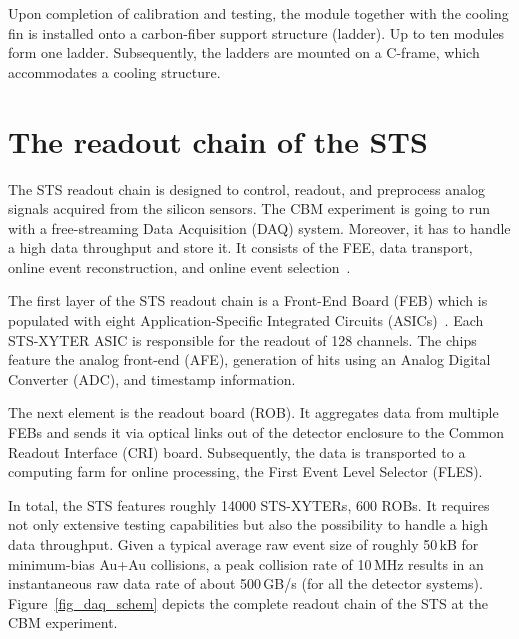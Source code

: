 Upon completion of calibration and testing, the module together with the cooling fin is installed onto a carbon-fiber support structure (ladder). Up to ten modules form one ladder. Subsequently, the ladders are mounted on a C-frame, which accommodates a cooling structure. 
\section{The readout chain of the STS}
\label{readout}
\label{DAQ}
The \gls{STS} readout chain is designed to control, readout, and preprocess analog signals acquired from the silicon sensors. The \gls{CBM} experiment is going to run with a free-streaming Data Acquisition (\gls{DAQ}) system. Moreover, it has to handle a high data throughput and store it. It consists of the \gls{FEE}, data transport, online event reconstruction, and online event selection~\cite{Kasinski1}.

The first layer of the \gls{STS} readout chain is a Front-End Board (\gls{FEB}) which is populated with eight Application-Specific Integrated Circuits (ASICs)~\cite{Kasinski2}. Each STS-XYTER \gls{ASIC} is responsible for the readout of 128 channels. The chips feature the analog front-end (\gls{AFE}), generation of hits using an Analog Digital Converter (\gls{ADC}), and timestamp information. 

The next element is the readout board (\gls{ROB}). It aggregates data from multiple \glspl{FEB} and sends it via optical links out of the detector enclosure to the Common Readout Interface (\gls{CRI}) board. Subsequently, the data is transported to a computing farm for online processing, the First Event Level Selector (\gls{FLES}). 

In total, the \gls{STS} features roughly 14000 STS-XYTERs, 600 \glspl{ROB}. It requires not only extensive testing capabilities but also the possibility to handle a high data throughput. Given a typical average raw event size of roughly 50\,kB for minimum-bias Au+Au collisions, a peak collision rate of 10\,MHz results in an instantaneous raw data rate of about 500\,GB/s (for all the detector systems). Figure~\ref{fig_daq_schem} depicts the complete readout chain of the \gls{STS} at the \gls{CBM} experiment. 

